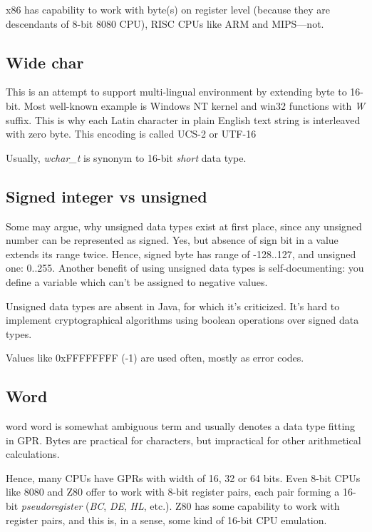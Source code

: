 x86 has capability to work with byte(s) on register level (because they are descendants of 8-bit 8080 CPU),
RISC CPUs like ARM and MIPS---not.

\subsection{Wide char}

This is an attempt to support multi-lingual environment by extending byte to 16-bit.
Most well-known example is Windows NT kernel and win32 functions with \emph{W} suffix.
This is why each Latin character in plain English text string is interleaved with zero byte.
This encoding is called UCS-2 or UTF-16

Usually, \emph{wchar\_t} is synonym to 16-bit \emph{short} data type.

\subsection{Signed integer vs unsigned}

Some may argue, why unsigned data types exist at first place, since any unsigned number can be represented as signed.
Yes, but absence of sign bit in a value extends its range twice.
Hence, signed byte has range of -128..127, and unsigned one: 0..255.
Another benefit of using unsigned data types is self-documenting:
you define a variable which can't be assigned to negative values.

Unsigned data types are absent in Java, for which it's criticized.
It's hard to implement cryptographical algorithms using boolean operations over signed data types.

Values like 0xFFFFFFFF (-1) are used often, mostly as error codes.

\subsection{Word}

\Gls{word} word is somewhat ambiguous term and usually denotes a data type fitting in \ac{GPR}.
Bytes are practical for characters, but impractical for other arithmetical calculations.

Hence, many \ac{CPU}s have \ac{GPR}s with width of 16, 32 or 64 bits.
Even 8-bit CPUs like 8080 and Z80 offer to work with 8-bit register pairs, each pair forming a 16-bit \emph{pseudoregister}
(\emph{BC}, \emph{DE}, \emph{HL}, etc.).
Z80 has some capability to work with register pairs, and this is, in a sense, some kind of 16-bit CPU emulation.


